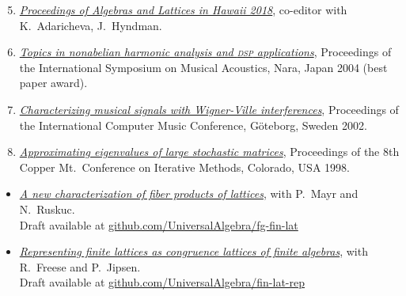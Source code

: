 \documentclass[12pt]{article}
\begin{document}
    \begin{enumerate}
      \setcounter{enumi}{4}

     \item \href{http://www.lulu.com/shop/kira-adaricheva-and-william-demeo-and-jennifer-hyndman/algebras-and-lattices-in-hawaii-honoring-ralph-freese-bill-lampe-and-jb-nation/paperback/product-23634583.html}{\it Proceedings of Algebras and Lattices in Hawaii 2018}, co-editor with K.~Adaricheva, J.~Hyndman.

    \item \href{https://github.com/williamdemeo/ISMA2004/raw/master/DeMeo-ISMA2004-FinalPaper.pdf}%
           {{\it Topics in nonabelian harmonic analysis and \textsc{dsp}  applications}},
      Proceedings of the International Symposium on Musical Acoustics, Nara, Japan 2004
      (best paper award).

    \item \href{https://github.com/williamdemeo/ICMC2002/raw/master/DeMeo-ICMC2002.pdf}%
           {\it Characterizing musical signals with Wigner-Ville interferences},
      Proceedings of the International Computer Music Conference, G\"{o}teborg, Sweden 2002.

     \item \href{https://williamdemeo.github.io/MSThesis}%
           {{\it Approximating eigenvalues of large stochastic matrices}},
      Proceedings of the 8th Copper Mt.~Conference on Iterative Methods,
      Colorado, USA 1998.
    \end{enumerate}


    \vskip5mm

    \begin{itemize}
         \item[] \href{https://github.com/UniversalAlgebra/fg-free-lat}
           {{\it A new characterization of fiber products of lattices}},
           with P.~Mayr and N.~Ruskuc. \\
           {\small Draft available at} \href{https://github.com/UniversalAlgebra/fg-free-lat}{{\small github.com/UniversalAlgebra/fg-fin-lat}}


    \item[] \href{https://github.com/UniversalAlgebra/fin-lat-rep}
           {{\it Representing finite lattices as congruence lattices of finite algebras}},
           with R.~Freese and P.~Jipsen. \\
           {\small Draft available at} \href{https://github.com/UniversalAlgebra/fin-lat-rep}{{\small github.com/UniversalAlgebra/fin-lat-rep}}
\end{itemize}
\vskip1cm
\end{document}

